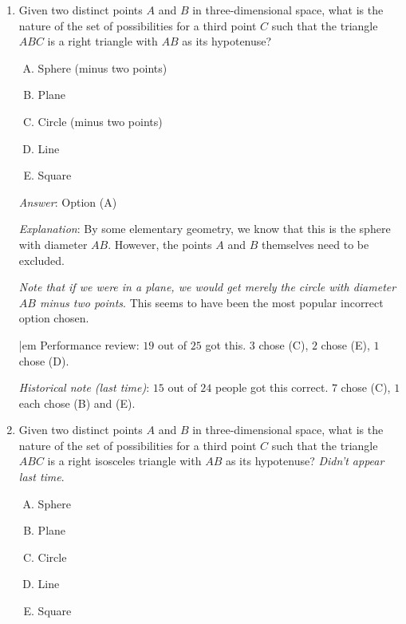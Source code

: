 \documentclass[10pt]{amsart}
\begin{document}
\begin{enumerate}
  {\em Answer}: Option (B)

  {\em Explanation}: This is the plane perpendicular to the line
  segment $AB$ and intersecting the line segment at its midpoint. It
  is the analogue in three dimensions of the perpendicular bisector in
  two dimensions.

  {\em Performance review}: $20$ out of $25$ got this. $3$ chose (A),
  $2$ chose (C).
\item Given two distinct points $A$ and $B$ in three-dimensional
  space, what is the nature of the set of possibilities for a third
  point $C$ such that the triangle $ABC$ is a right triangle with $AB$
  as its hypotenuse?

  \begin{enumerate}[(A)]
  \item Sphere (minus two points)
  \item Plane
  \item Circle (minus two points)
  \item Line
  \item Square
  \end{enumerate}

  {\em Answer}: Option (A)

  {\em Explanation}: By some elementary geometry, we know that this is
  the sphere with diameter $AB$. However, the points $A$ and $B$
  themselves need to be excluded.

  {\em Note that if we were in a plane, we would get merely the circle
  with diameter $AB$ minus two points}. This seems to have been the
  most popular incorrect option chosen.

  {|em Performance review}: $19$ out of $25$ got this. $3$ chose (C),
  $2$ chose (E), $1$ chose (D).

  {\em Historical note (last time)}: $15$ out of $24$ people got this correct.
  $7$ chose (C), $1$ each chose (B) and (E).

\item Given two distinct points $A$ and $B$ in three-dimensional
  space, what is the nature of the set of possibilities for a third
  point $C$ such that the triangle $ABC$ is a right isosceles triangle
  with $AB$ as its hypotenuse? {\em Didn't appear last time}.

  \begin{enumerate}[(A)]
  \item Sphere
  \item Plane
  \item Circle
  \item Line
  \item Square
  \end{enumerate}


\end{enumerate}
\end{document}
